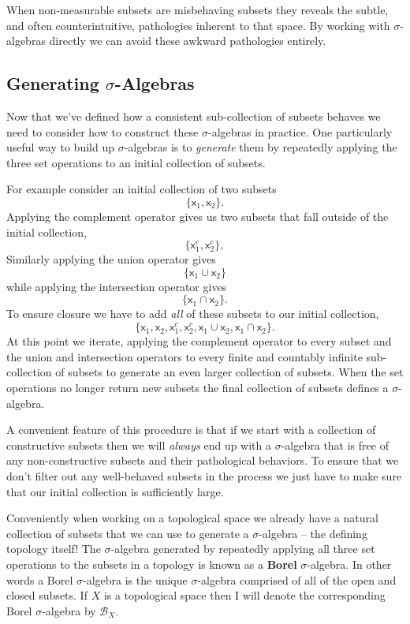 \documentclass[
  letterpaper,
  DIV=11,
  numbers=noendperiod]{scrartcl}
\begin{document}
When non-measurable subsets are misbehaving subsets they reveals the
subtle, and often counterintuitive, pathologies inherent to that space.
By working with \(\sigma\)-algebras directly we can avoid these awkward
pathologies entirely.

\hypertarget{generating-sigma-algebras}{%
\subsection{\texorpdfstring{Generating
{\(\sigma\)}-Algebras}{Generating \textbackslash sigma-Algebras}}\label{generating-sigma-algebras}}

Now that we've defined how a consistent sub-collection of subsets
behaves we need to consider how to construct these \(\sigma\)-algebras
in practice. One particularly useful way to build up \(\sigma\)-algebras
is to \emph{generate} them by repeatedly applying the three set
operations to an initial collection of subsets.

For example consider an initial collection of two subsets \[
\{ \mathsf{x}_1, \mathsf{x}_2 \}.
\] Applying the complement operator gives us two subsets that fall
outside of the initial collection, \[
\{ \mathsf{x}_1^c, \mathsf{x}_2^c \},
\] Similarly applying the union operator gives \[
\{ \mathsf{x}_1 \cup \mathsf{x}_2 \}
\] while applying the intersection operator gives \[
\{ \mathsf{x}_1 \cap \mathsf{x}_2 \}.
\] To ensure closure we have to add \emph{all} of these subsets to our
initial collection, \[
\{ \mathsf{x}_1, \mathsf{x}_2, \mathsf{x}_1^c, \mathsf{x}_2^c,
   \mathsf{x}_1 \cup \mathsf{x}_2, \mathsf{x}_1 \cap \mathsf{x}_2 \}.
\] At this point we iterate, applying the complement operator to every
subset and the union and intersection operators to every finite and
countably infinite sub-collection of subsets to generate an even larger
collection of subsets. When the set operations no longer return new
subsets the final collection of subsets defines a \(\sigma\)-algebra.

A convenient feature of this procedure is that if we start with a
collection of constructive subsets then we will \emph{always} end up
with a \(\sigma\)-algebra that is free of any non-constructive subsets
and their pathological behaviors. To ensure that we don't filter out any
well-behaved subsets in the process we just have to make sure that our
initial collection is sufficiently large.

Conveniently when working on a topological space we already have a
natural collection of subsets that we can use to generate a
\(\sigma\)-algebra -- the defining topology itself! The
\(\sigma\)-algebra generated by repeatedly applying all three set
operations to the subsets in a topology is known as a \textbf{Borel}
\(\sigma\)-algebra. In other words a Borel \(\sigma\)-algebra is the
unique \(\sigma\)-algebra comprised of all of the open and closed
subsets. If \(X\) is a topological space then I will denote the
corresponding Borel \(\sigma\)-algebra by \(\mathcal{B}_{X}\).
\end{document}
